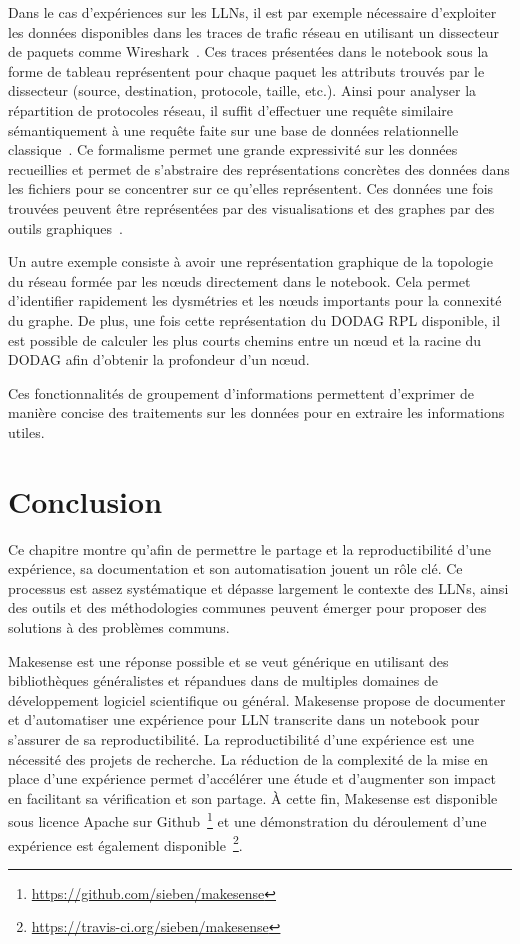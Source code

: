 Dans le cas d'expériences sur les \ac{LLN}s, il est par exemple nécessaire d'exploiter les données disponibles dans les traces de trafic réseau en utilisant un dissecteur de paquets comme Wireshark~\cite{tshark}.
Ces traces présentées dans le notebook sous la forme de tableau représentent pour chaque paquet les attributs trouvés par le dissecteur (source, destination, protocole, taille, etc.).
Ainsi pour analyser la répartition de protocoles réseau, il suffit d'effectuer une requête similaire sémantiquement à une requête faite sur une base de données relationnelle classique~\cite{mckinney2012python}.
Ce formalisme permet une grande expressivité sur les données recueillies et permet de s'abstraire des représentations concrètes des données dans les fichiers pour se concentrer sur ce qu'elles représentent.
Ces données une fois trouvées peuvent être représentées par des visualisations et des graphes par des outils graphiques~\cite{Hunter:2007}.

Un autre exemple consiste à avoir une représentation graphique de la topologie du réseau formée par les nœuds directement dans le notebook.
Cela permet d'identifier rapidement les dysmétries et les nœuds importants pour la connexité du graphe.
De plus, une fois cette représentation du \ac{DODAG} \ac{RPL} disponible, il est possible de calculer les plus courts chemins entre un nœud et la racine du \ac{DODAG} afin d'obtenir la profondeur d'un nœud.

Ces fonctionnalités de groupement d'informations permettent d'exprimer de manière concise des traitements sur les données pour en extraire les informations utiles.

\section{Conclusion} 
\label{makesense:conclusion}

Ce chapitre montre qu'afin de permettre le partage et la reproductibilité d'une expérience, sa documentation et son automatisation jouent un rôle clé.
Ce processus est assez systématique et dépasse largement le contexte des \ac{LLN}s, ainsi des outils et des méthodologies communes peuvent émerger pour proposer des solutions à des problèmes communs.

Makesense est une réponse possible et se veut générique en utilisant des bibliothèques généralistes et répandues dans de multiples domaines de développement logiciel scientifique ou général.
Makesense propose de documenter et d'automatiser une expérience pour \ac{LLN} transcrite dans un notebook pour s'assurer de sa reproductibilité.
La reproductibilité d'une expérience est une nécessité des projets de recherche.
La réduction de la complexité de la mise en place d'une expérience permet d’accélérer une étude et d'augmenter son impact en facilitant sa vérification et son partage.
À cette fin, Makesense est disponible sous licence Apache sur Github~\footnote{\href{https://github.com/sieben/makesense}{https://github.com/sieben/makesense}} et une démonstration du déroulement d'une expérience est également disponible~\footnote{\href{https://travis-ci.org/sieben/makesense}{https://travis-ci.org/sieben/makesense}}.

